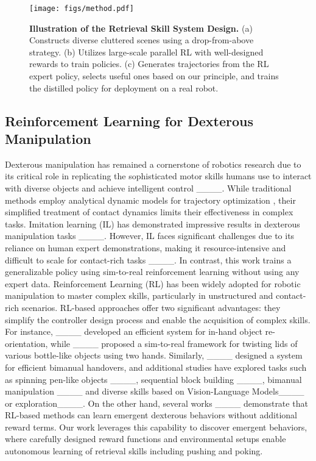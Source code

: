 \begin{figure*}
    \centering
    \texttt{[image: figs/method.pdf]}
    \caption{\textbf{Illustration of the Retrieval Skill System Design.} (a) Constructs diverse cluttered scenes using a drop-from-above strategy. (b) Utilizes large-scale parallel RL with well-designed rewards to train policies. (c) Generates trajectories from the RL expert policy, selects useful ones based on our principle, and trains the distilled policy for deployment on a real robot.}
    \label{fig:method}
\end{figure*}

\subsection{Reinforcement Learning for Dexterous Manipulation}
Dexterous manipulation has remained a cornerstone of robotics research due to its critical role in replicating the sophisticated motor skills humans use to interact with diverse objects and achieve intelligent control ____. While traditional methods employ analytical dynamic models for trajectory optimization
, their simplified treatment of contact dynamics limits their effectiveness in complex tasks. Imitation learning (IL) has demonstrated impressive results in dexterous manipulation tasks ____. However, IL faces significant challenges due to its reliance on human expert demonstrations, making it resource-intensive and difficult to scale for contact-rich tasks ____. In contrast, this work trains a generalizable policy using sim-to-real reinforcement learning without using any expert data. Reinforcement Learning (RL) has been widely adopted for robotic manipulation to master complex skills, particularly in unstructured and contact-rich scenarios. RL-based approaches offer two significant advantages: they simplify the controller design process and enable the acquisition of complex skills. For instance, ____ developed an efficient system for in-hand object re-orientation, while ____ proposed a sim-to-real framework for twisting lids of various bottle-like objects using two hands. Similarly, ____ designed a system for efficient bimanual handovers, and additional studies have explored tasks such as spinning pen-like objects ____, sequential block building ____, bimanual manipulation ____ and diverse skills based on Vision-Language Models____ or exploration____. On the other hand, several works ____ demonstrate that RL-based methods can learn emergent dexterous behaviors without additional reward terms. Our work leverages this capability to discover emergent behaviors, where carefully designed reward functions and environmental setups enable autonomous learning of retrieval skills including pushing and poking.